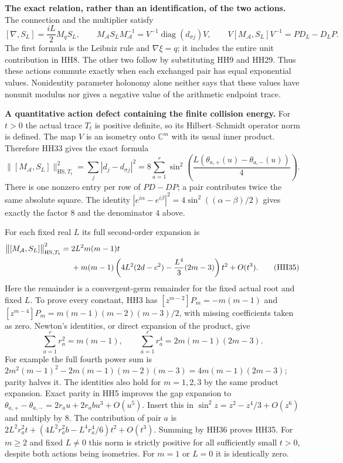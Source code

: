 \HH\textbf{The exact relation, rather than an identification, of the two actions.}
The connection and the multiplier satisfy
\[
 [\nabla,S_L]=\frac{iL}{2}M_qS_L,\qquad
 M_{\mathcal A}S_LM_{\mathcal A}^{-1}
      =V^{-1}\operatorname{diag}(d_{\sigma j})V,\qquad
 V[M_{\mathcal A},S_L]V^{-1}=P D_L-D_LP .
 \tag{HH33}\label{hh:action-defect}
\]
The first formula is the Leibniz rule and $\nabla\xi=q$;
it includes the entire unit contribution in HH8.
The other two follow by substituting HH9 and HH29.
Thus these actions commute exactly when each exchanged pair has
equal exponential values. Nonidentity parameter holonomy alone
neither says that these values have nonunit modulus nor gives a
negative value of the arithmetic endpoint trace.

\HH\textbf{A quantitative action defect containing the finite collision energy.}
For $t>0$ the actual trace $T_t$ is positive definite, so its
Hilbert--Schmidt operator norm is defined. The map $V$ is an isometry
onto $\mathbb C^m$ with its usual inner product. Therefore HH33 gives
the exact formula
\[
 \bigl\|[M_{\mathcal A},S_L]\bigr\|_{\mathrm{HS},T_t}^2
  =\sum_j|d_j-d_{\sigma j}|^2
  =8\sum_{a=1}^r
       \sin^2\!\left(\frac{L(\theta_{a,+}(u)
                                    -\theta_{a,-}(u))}{4}\right).
 \tag{HH34}\label{hh:hs-exact}
\]
There is one nonzero entry per row of $P D-DP$; a pair contributes
twice the same absolute square. The identity
$|e^{i\alpha}-e^{i\beta}|^2=4\sin^2((\alpha-\beta)/2)$ gives
exactly the factor $8$ and the denominator $4$ above.

For each fixed real $L$ its full second-order expansion is
\begin{align}
 \bigl\|[M_{\mathcal A},S_L]\bigr\|_{\mathrm{HS},T_t}^2
  ={}&2L^2m(m-1)t \notag\\
   &+m(m-1)\left(4L^2(2d-c^2)
                    -\frac{L^4}{3}(2m-3)\right)t^2+O(t^3).
 \tag{HH35}\label{hh:hs-expansion}
\end{align}
Here the remainder is a convergent-germ remainder for the fixed
actual root and fixed $L$. To prove every constant, HH3 has
$[z^{m-2}]P_m=-m(m-1)$ and
$[z^{m-4}]P_m=m(m-1)(m-2)(m-3)/2$, with missing coefficients
taken as zero. Newton's identities, or direct expansion of the
product, give
\[
 \sum_{a=1}^r r_a^2=m(m-1),\qquad
 \sum_{a=1}^r r_a^4=2m(m-1)(2m-3).
 \tag{HH36}
\]
For example the full fourth power sum is
$2m^2(m-1)^2-2m(m-1)(m-2)(m-3)
=4m(m-1)(2m-3)$; parity halves it.
The identities also hold for $m=1,2,3$ by the same product expansion.
Exact parity in HH5 improves the gap expansion to
$\theta_{a,+}-\theta_{a,-}=2r_au+2r_ab u^3+O(u^5)$.
Insert this in $\sin^2z=z^2-z^4/3+O(z^6)$ and multiply by $8$.
The contribution of pair $a$ is
$2L^2r_a^2t+(4L^2r_a^2b-L^4r_a^4/6)t^2+O(t^3)$.
Summing by HH36 proves HH35.
For $m\ge2$ and fixed $L\ne0$ this norm is strictly positive for all
sufficiently small $t>0$, despite both actions being isometries.
For $m=1$ or $L=0$ it is identically zero.

